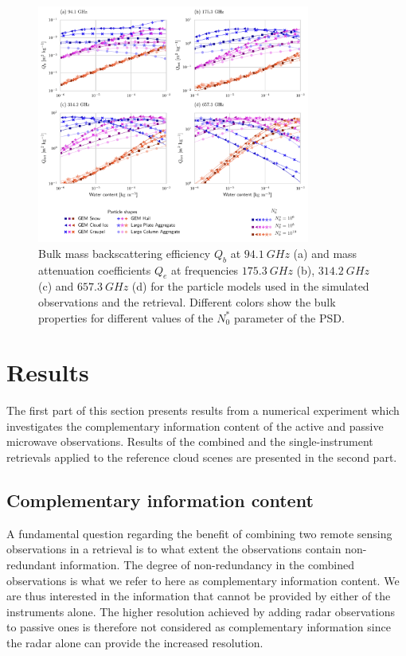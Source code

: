 \documentclass[journal abbreviation, manuscript]{copernicus}
\begin{document}
\begin{figure}
  \centering
  \includegraphics[width=0.8\textwidth]{../plots/particle_properties_d14}
  \caption{Bulk mass backscattering efficiency $Q_b$ at $94.1\ \unit{GHz}$ (a)
    and mass attenuation coefficients $Q_{e}$ at frequencies $175.3\ \unit{GHz}$
    (b), $314.2\ \unit{GHz}$ (c) and $657.3\ \unit{GHz}$ (d) for the particle
    models used in the simulated observations and the retrieval. Different
    colors show the bulk properties for different values of the $N_0^*$
    parameter of the PSD.}
  \label{fig:particle_properties}
\end{figure}

\section{Results}
\label{sec:results}

The first part of this section presents results from a numerical experiment which
investigates the complementary information content of the active and passive
microwave observations. Results of the combined and the single-instrument
retrievals applied to the reference cloud scenes are presented in the second
part.

\subsection{Complementary information content}
\label{sec:simple_cloud}

A fundamental question regarding the benefit of combining two remote sensing
observations in a retrieval is to what extent the observations contain
non-redundant information. The degree of non-redundancy in the combined
observations is what we refer to here as complementary information content. We
are thus interested in the information that cannot be provided by either of the
instruments alone. The higher resolution achieved by adding radar observations
to passive ones is therefore not considered as complementary information since
the radar alone can provide the increased resolution.
\end{document}
